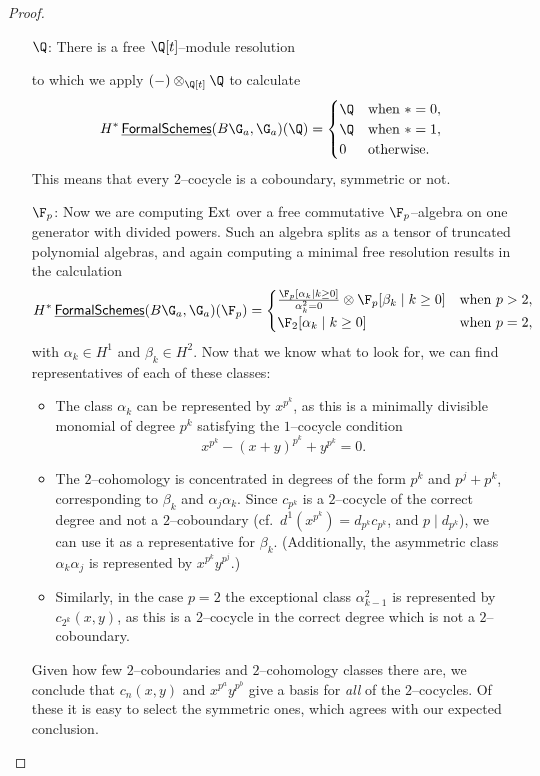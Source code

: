 \begin{proof}
\begin{itemize}
\item[$\Q$:] There is a free $\Q[t]$--module resolution
\begin{center}
\end{center}
to which we apply $(-) \otimes_{\Q[t]} \Q$ to calculate \[H^* \InternalHom{FormalSchemes}(B\G_a, \G_a)(\Q) = \begin{cases} \Q & \text{when $* = 0$}, \\ \Q & \text{when $* = 1$}, \\ 0 & \text{otherwise}. \end{cases}\] This means that every $2$--cocycle is a coboundary, symmetric or not.
\item[$\F_p$:] Now we are computing $\operatorname{Ext}$ over a free commutative $\F_p$--algebra on one generator with divided powers.  Such an algebra splits as a tensor of truncated polynomial algebras, and again computing a minimal free resolution results in the calculation
\[H^* \InternalHom{FormalSchemes}(B\G_a, \G_a)(\F_p) =
\begin{cases}
\frac{\F_p[\alpha_k \mid k \ge 0]}{\alpha_k^2 = 0} \otimes \F_p[\beta_k \mid k \ge 0] & \text{when $p > 2$}, \\
\F_2[\alpha_k \mid k \ge 0] & \text{when $p = 2$},
\end{cases}\] with $\alpha_k \in H^1$ and $\beta_k \in H^2$.  Now that we know what to look for, we can find representatives of each of these classes:
\begin{itemize}
\item The class $\alpha_k$ can be represented by $x^{p^k}$, as this is a minimally divisible monomial of degree $p^k$ satisfying the $1$--cocycle condition \[x^{p^k} - (x+y)^{p^k} + y^{p^k} = 0.\]
\item The $2$--cohomology is concentrated in degrees of the form $p^k$ and $p^j + p^k$, corresponding to $\beta_k$ and $\alpha_j \alpha_k$.  Since $c_{p^k}$ is a $2$--cocycle of the correct degree and not a $2$--coboundary (cf.\ $d^1(x^{p^k}) = d_{p^k} c_{p^k}$, and $p \mid d_{p^k}$), we can use it as a representative for $\beta_k$.  (Additionally, the asymmetric class $\alpha_k \alpha_j$ is represented by $x^{p^k} y^{p^j}$.)
\item Similarly, in the case $p = 2$ the exceptional class $\alpha_{k-1}^2$ is represented by $c_{2^k}(x, y)$, as this is a $2$--cocycle in the correct degree which is not a $2$--coboundary.
\end{itemize}
Given how few $2$--coboundaries and $2$--cohomology classes there are, we conclude that $c_n(x, y)$ and $x^{p^a} y^{p^b}$ give a basis for \emph{all} of the $2$--cocycles.  Of these it is easy to select the symmetric ones, which agrees with our expected conclusion. \qedhere
\end{itemize}
\end{proof}

